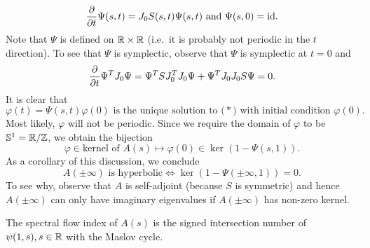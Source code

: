 \begin{equation*}
  \frac{\partial }{\partial t}\Psi(s,t)=J_{0}S(s,t)\Psi(s,t)\text{ and }\Psi(s,0)=\mathrm{id}.
\end{equation*}
Note that $\Psi$ is defined on $\mathbb{R}\times \mathbb{R}$ (i.e.\ it is probably not
periodic in the $t$ direction). To see that $\Psi$ is symplectic,
observe that $\Psi$ is symplectic at $t=0$ and
\begin{equation*}
  \frac{\partial }{\partial t}\Psi^{T}J_{0}\Psi=\Psi^{T}SJ_{0}^{T}J_{0}\Psi+\Psi^{T}J_{0}J_{0}S\Psi=0.
\end{equation*}
It is clear that
\begin{equation*}
  \varphi(t)=\Psi(s,t)\varphi(0)\text{ is the unique solution to
    ($\ast$) with initial condition $\varphi(0)$}.
\end{equation*}
Most likely, $\varphi$ will not be periodic. Since we require the
domain of $\varphi$ to be $\mathbb{S}^{1}=\mathbb{R}/\mathbb{Z}$, we obtain the bijection
\begin{equation*}
  \varphi\in \text{kernel of $A(s)$}\mapsto \varphi(0)\in \ker(1-\Psi(s,1)).
\end{equation*}
As a corollary of this discussion, we conclude
\begin{equation*}
  A(\pm \infty)\text{ is hyperbolic}\iff \ker(1-\Psi(\pm \infty,1))=0.
\end{equation*}
To see why, observe that $A$ is self-adjoint (because $S$ is
symmetric) and hence $A(\pm \infty)$ can only have imaginary
eigenvalues if $A(\pm \infty)$ has non-zero kernel.

\begin{claim}
  The spectral flow index of $A(s)$ is the signed intersection number
  of $\psi(1,s), s\in \mathbb{R}$ with the Maslov cycle.
\end{claim}

